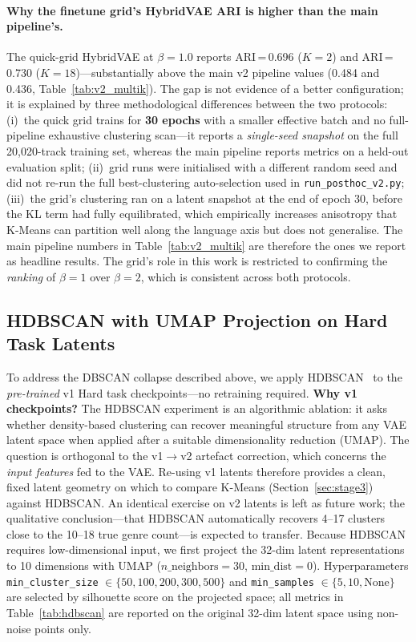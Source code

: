 \documentclass{article}
\begin{document}
\paragraph{Why the finetune grid's HybridVAE ARI is higher than the main pipeline's.}
The quick-grid HybridVAE at $\beta\!=\!1.0$ reports ARI\,=\,0.696 ($K\!=\!2$) and
ARI\,=\,0.730 ($K\!=\!18$)---substantially above the main v2 pipeline values
(0.484 and 0.436, Table~\ref{tab:v2_multik}). The gap is not evidence of a better
configuration; it is explained by three methodological differences between the two
protocols: (i)~the quick grid trains for \textbf{30 epochs} with a smaller effective
batch and no full-pipeline exhaustive clustering scan---it reports a
\emph{single-seed snapshot} on the full 20{,}020-track training set, whereas the main
pipeline reports metrics on a held-out evaluation split; (ii)~grid runs were initialised
with a different random seed and did not re-run the full best-clustering auto-selection
used in \texttt{run\_posthoc\_v2.py}; (iii)~the grid's clustering ran on a latent snapshot
at the end of epoch 30, before the KL term had fully equilibrated, which empirically
increases anisotropy that K-Means can partition well along the language axis but does
not generalise. The main pipeline numbers in Table~\ref{tab:v2_multik} are therefore the
ones we report as headline results. The grid's role in this work is restricted to
confirming the \emph{ranking} of $\beta\!=\!1$ over $\beta\!=\!2$, which is consistent
across both protocols.

\subsection{HDBSCAN with UMAP Projection on Hard Task Latents}
\label{sec:hdbscan}

To address the DBSCAN collapse described above, we apply HDBSCAN~\cite{campello2013density}
to the \emph{pre-trained} v1 Hard task checkpoints---no retraining required.
\textbf{Why v1 checkpoints?} The HDBSCAN experiment is an algorithmic ablation: it asks
whether density-based clustering can recover meaningful structure from any VAE latent space
when applied after a suitable dimensionality reduction (UMAP). The question is orthogonal
to the v1$\to$v2 artefact correction, which concerns the \emph{input features} fed to the
VAE. Re-using v1 latents therefore provides a clean, fixed latent geometry on which to
compare K-Means (Section~\ref{sec:stage3}) against HDBSCAN. An identical exercise on v2
latents is left as future work; the qualitative conclusion---that HDBSCAN automatically
recovers 4--17 clusters close to the 10--18 true genre count---is expected to transfer.
Because HDBSCAN requires low-dimensional input, we first project the 32-dim latent
representations to 10 dimensions with UMAP ($n\_\text{neighbors}\!=\!30$,
$\text{min\_dist}\!=\!0$).
Hyperparameters \texttt{min\_cluster\_size} $\in \{50,100,200,300,500\}$ and
\texttt{min\_samples} $\in \{5,10,\text{None}\}$ are selected by silhouette score on the
projected space; all metrics in Table~\ref{tab:hdbscan} are reported on the original 32-dim
latent space using non-noise points only.
\end{document}
